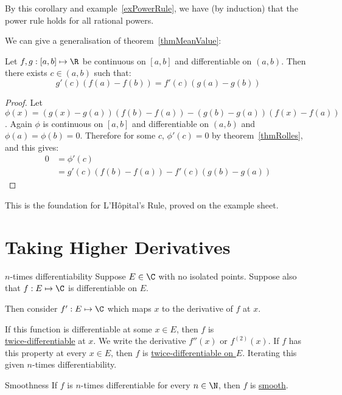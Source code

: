 \documentclass[../Main.tex]{subfiles}
\begin{document}
\begin{remark}
    By this corollary and example~\ref{exPowerRule}, we have (by induction) that the power rule holds for all rational powers.
\end{remark}
We can give a generalisation of theorem~\ref{thmMeanValue}:
\begin{theorem}
    Let $f, g : [a, b] \mapsto \R$ be continuous on $[a, b]$ and differentiable on $(a, b)$. Then there exists $c \in (a, b)$ such that:
    \begin{equation*}
        g'(c)(f(a) - f(b)) = f'(c)(g(a) - g(b))
    \end{equation*}
    \label{thmCauchyMeanValue}
\end{theorem}
\begin{proof}
    Let $\phi(x) = (g(x) - g(a))(f(b) - f(a)) - (g(b) - g(a))(f(x) - f(a))$. Again $\phi$ is continuous on $[a, b]$ and differentiable on $(a, b)$ and $\phi(a) = \phi(b) = 0$. Therefore for some $c$, $\phi'(c) = 0$ by theorem~\ref{thmRolles}, and this gives:
    \begin{align*}
        0 &= \phi'(c) \\
        &= g'(c) (f(b) - f(a)) - f'(c)(g(b) - g(a))
    \end{align*}
\end{proof}
\begin{remark}
    This is the foundation for L'H\^opital's Rule, proved on the example sheet.
\end{remark}
\section{Taking Higher Derivatives}
\begin{definition}{$n$-times differentiability}
    Suppose $E \in \C$ with no isolated points. Suppose also that $f : E \mapsto \C$ is differentiable on $E$.\par
    Then consider $f' : E \mapsto \C$ which maps $x$ to the derivative of $f$ at $x$.\par
    If this function is differentiable at some $x \in E$, then $f$ is \\\underline{twice-differentiable} at $x$. We write the derivative $f''(x)$ or $f^{(2)}(x)$. If $f$ has this property at every $x \in E$, then $f$ is \underline{twice-differentiable on $E$}. Iterating this given $n$-times differentiability.
\end{definition}
\begin{definition}{Smoothness}
    If $f$ is $n$-times differentiable for every $n \in \N$, then $f$ is \underline{smooth}.
\end{definition}
\end{document}
